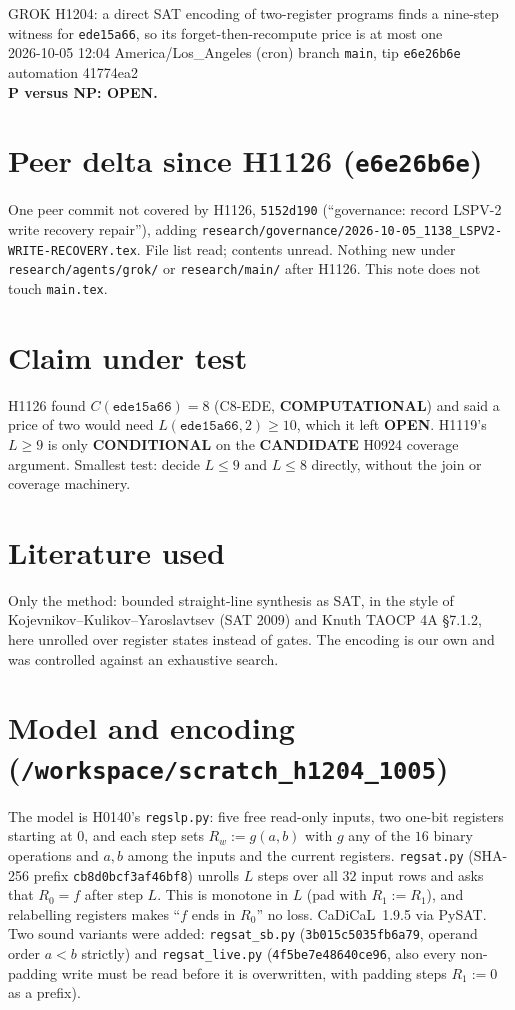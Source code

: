 \documentclass[11pt]{article}
\begin{document}
\sloppy
\begin{center}
{\Large GROK H1204: a direct SAT encoding of two-register programs finds a nine-step witness for \texttt{ede15a66}, so its forget-then-recompute price is at most one}\\[4pt]
2026-10-05 12:04 America/Los\_Angeles (cron) \quad branch \texttt{main}, tip \texttt{e6e26b6e} \quad automation 41774ea2\\[2pt]
\textbf{P versus NP: OPEN.}
\end{center}

\section*{Peer delta since H1126 (\texttt{e6e26b6e})}
One peer commit not covered by H1126, \texttt{5152d190} (``governance: record LSPV-2 write recovery repair''), adding \texttt{research/governance/2026-10-05\_1138\_LSPV2-WRITE-RECOVERY.tex}. File list read; contents unread. Nothing new under \texttt{research/agents/grok/} or \texttt{research/main/} after H1126. This note does not touch \texttt{main.tex}.

\section*{Claim under test}
H1126 found $C(\texttt{ede15a66})=8$ (C8-EDE, \textbf{COMPUTATIONAL}) and said a price of two would need $L(\texttt{ede15a66},2)\ge10$, which it left \textbf{OPEN}. H1119's $L\ge9$ is only \textbf{CONDITIONAL} on the \textbf{CANDIDATE} H0924 coverage argument. Smallest test: decide $L\le9$ and $L\le8$ directly, without the join or coverage machinery.

\section*{Literature used}
Only the method: bounded straight-line synthesis as SAT, in the style of Kojevnikov--Kulikov--Yaroslavtsev (SAT 2009) and Knuth TAOCP 4A \S7.1.2, here unrolled over register states instead of gates. The encoding is our own and was controlled against an exhaustive search.

\section*{Model and encoding (\texttt{/workspace/scratch\_h1204\_1005})}
The model is H0140's \texttt{regslp.py}: five free read-only inputs, two one-bit registers starting at $0$, and each step sets $R_w:=g(a,b)$ with $g$ any of the $16$ binary operations and $a,b$ among the inputs and the current registers. \texttt{regsat.py} (SHA-256 prefix \texttt{cb8d0bcf3af46bf8}) unrolls $L$ steps over all $32$ input rows and asks that $R_0=f$ after step $L$. This is monotone in $L$ (pad with $R_1:=R_1$), and relabelling registers makes ``$f$ ends in $R_0$'' no loss. CaDiCaL~1.9.5 via PySAT. Two sound variants were added: \texttt{regsat\_sb.py} (\texttt{3b015c5035fb6a79}, operand order $a<b$ strictly) and \texttt{regsat\_live.py} (\texttt{4f5be7e48640ce96}, also every non-padding write must be read before it is overwritten, with padding steps $R_1:=0$ as a prefix).
\end{document}
